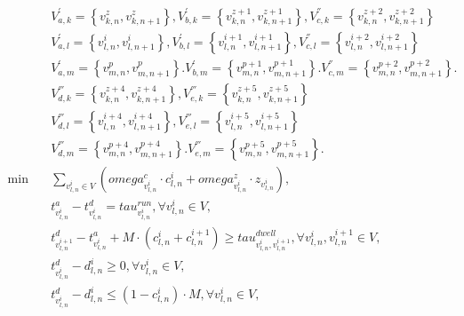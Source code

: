 \begin{align}
  & V_{a , k}^{'} = \left\{v_{k , n}^{z} , v_{k , n + 1}^{z}\right\} , V_{b , k}^{'} = \left\{v_{k , n}^{z + 1} , v_{k , n + 1}^{z + 1}\right\} , V_{c , k}^{''} = \left\{v_{k , n}^{z + 2} , v_{k , n + 1}^{z + 2}\right\} \tag{eq\_0001\_a} \\
  & V_{a , l}^{'} = \left\{v_{l , n}^{i} , v_{l , n + 1}^{i}\right\} , V_{b , l}^{'} = \left\{v_{l , n}^{i + 1} , v_{l , n + 1}^{i + 1}\right\} , V_{c , l}^{''} = \left\{v_{l , n}^{i + 2} , v_{l , n + 1}^{i + 2}\right\} \tag{eq\_0001\_b} \\
  & V_{a , m}^{'} = \left\{v_{m , n}^{p} , v_{m , n + 1}^{p}\right\} . V_{b , m}^{'} = \left\{v_{m , n}^{p + 1} , v_{m , n + 1}^{p + 1}\right\} . V_{c , m}^{''} = \left\{v_{m , n}^{p + 2} , v_{m , n + 1}^{p + 2}\right\} . \tag{eq\_0001\_c} \\
  & V_{d , k}^{'''} = \left\{v_{k , n}^{z + 4} , v_{k , n + 1}^{z + 4}\right\} , V_{e , k}^{'''} = \left\{v_{k , n}^{z + 5} , v_{k , n + 1}^{z + 5}\right\} \tag{eq\_0002\_a} \\
  & V_{d , l}^{'''} = \left\{v_{l , n}^{i + 4} , v_{l , n + 1}^{i + 4}\right\} , V_{e , l}^{'''} = \left\{v_{l , n}^{i + 5} , v_{l , n + 1}^{i + 5}\right\} \tag{eq\_0002\_b} \\
  & V_{d , m}^{'''} = \left\{v_{m , n}^{p + 4} , v_{m , n + 1}^{p + 4}\right\} . V_{e , m}^{'''} = \left\{v_{m , n}^{p + 5} , v_{m , n + 1}^{p + 5}\right\} . \tag{eq\_0002\_c} \\
  \min\quad & \sum_{v_{l , n}^{i} \in V} \left(\mathit{omega}_{v_{l , n}^{i}}^{c} \cdot c_{l , n}^{i} + \mathit{omega}_{v_{l , n}^{i}}^{z} \cdot z_{v_{l , n}^{i}}\right) , \tag{eq\_0016} \\
  & t_{v_{l , n}^{i}}^{a} - t_{v_{l , n}^{i}}^{d} = \mathit{tau}_{v_{l , n}^{i}}^{\mathit{run}} , \forall v_{l , n}^{i} \in V , \tag{eq\_0017} \\
  & t_{v_{l , n}^{i + 1}}^{d} - t_{v_{l , n}^{i}}^{a} + M \cdot \left(c_{l , n}^{i} + c_{l , n}^{i + 1}\right) \geq \mathit{tau}_{v_{l , n}^{i} , v_{l , n}^{i + 1}}^{\mathit{dwell}} , \forall v_{l , n}^{i} , v_{l , n}^{i + 1} \in V , \tag{eq\_0018} \\
  & t_{v_{l , n}^{i}}^{d} - d_{l , n}^{i} \geq 0 , \forall v_{l , n}^{i} \in V , \tag{eq\_0019} \\
  & t_{v_{l , n}^{i}}^{d} - d_{l , n}^{i} \leq \left(1 - c_{l , n}^{i}\right) \cdot M , \forall v_{l , n}^{i} \in V , \tag{eq\_0020} \\

\end{align}
